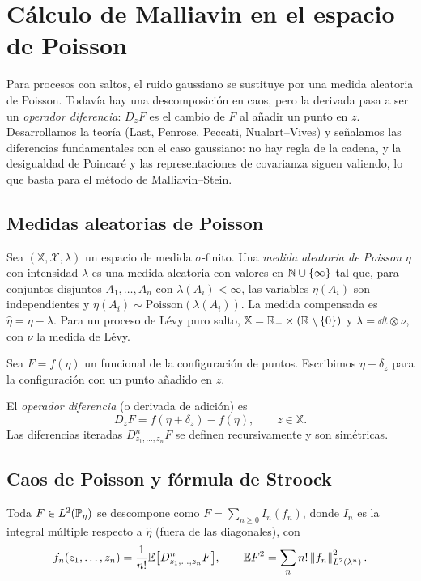\chapter{Cálculo de Malliavin en el espacio de Poisson}\label{cap:poisson}

\begin{panorama}
Para procesos con saltos, el ruido gaussiano se sustituye por una medida aleatoria de
Poisson. Todavía hay una descomposición en caos, pero la derivada pasa a ser un \emph{operador
diferencia}: $D_zF$ es el cambio de $F$ al añadir un punto en $z$. Desarrollamos la teoría (Last,
Penrose, Peccati, Nualart--Vives) y señalamos las diferencias fundamentales con el caso
gaussiano: no hay regla de la cadena, y la desigualdad de Poincaré y las representaciones
de covarianza siguen valiendo, lo que basta para el método de Malliavin--Stein.
\end{panorama}

\section{Medidas aleatorias de Poisson}
Sea $(\mathbb X,\mathcal X,\lambda)$ un espacio de medida $\sigma$-finito. Una \emph{medida aleatoria de Poisson} $\eta$ con intensidad
$\lambda$ es una medida aleatoria con valores en $\N\cup\{\infty\}$ tal que, para conjuntos disjuntos $A_1,\dots,A_n$
con $\lambda(A_i)<\infty$, las variables $\eta(A_i)$ son independientes y $\eta(A_i)\sim\mathrm{Poisson}(\lambda(A_i))$. La medida
compensada es $\hat\eta=\eta-\lambda$. Para un proceso de Lévy puro salto, $\mathbb X=\R_+\times(\R\setminus\{0\})$ y $\lambda=\dd t\otimes\nu$,
con $\nu$ la medida de Lévy.

Sea $F=f(\eta)$ un funcional de la configuración de puntos. Escribimos $\eta+\delta_z$ para la
configuración con un punto añadido en $z$.

\begin{definicion}
El \emph{operador diferencia} (o derivada de adición) es
\[
  D_zF=f(\eta+\delta_z)-f(\eta),\qquad z\in\mathbb X.
\]
Las diferencias iteradas $D^n_{z_1,\dots,z_n}F$ se definen recursivamente y son simétricas.
\end{definicion}

\section{Caos de Poisson y fórmula de Stroock}

\begin{teorema}
Toda $F\in L^2(\P_\eta)$ se descompone como $F=\sum_{n\ge0}I_n(f_n)$,
donde $I_n$ es la integral múltiple respecto a $\hat\eta$ (fuera de las diagonales), con
\[
  f_n(z_1,\dots,z_n)=\frac1{n!}\E\big[D^n_{z_1,\dots,z_n}F\big],\qquad\E F^2=\sum_nn!\norm{f_n}^2_{L^2(\lambda^n)}.
\]
\end{teorema}

